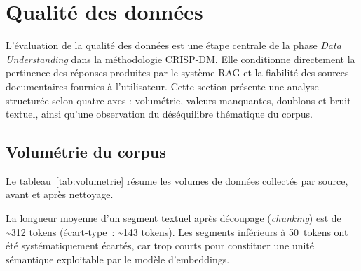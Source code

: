 \section{Qualité des données}
\label{sec:qualite_donnees}

L’évaluation de la qualité des données est une étape centrale de la phase \textit{Data Understanding} dans la méthodologie CRISP-DM. Elle conditionne directement la pertinence des réponses produites par le système RAG et la fiabilité des sources documentaires fournies à l’utilisateur. Cette section présente une analyse structurée selon quatre axes : volumétrie, valeurs manquantes, doublons et bruit textuel, ainsi qu’une observation du déséquilibre thématique du corpus.

\subsection{Volumétrie du corpus}

Le tableau~\ref{tab:volumetrie} résume les volumes de données collectés par source, avant et après nettoyage.

\begin{table}[H]
\centering
\renewcommand{\arraystretch}{1.3}
\caption{Volumétrie du corpus par source}
\label{tab:volumetrie}
\end{table}

La longueur moyenne d’un segment textuel après découpage (\textit{chunking}) est de \textasciitilde{}312 tokens (écart-type~: \textasciitilde{}143 tokens). Les segments inférieurs à 50~tokens ont été systématiquement écartés, car trop courts pour constituer une unité sémantique exploitable par le modèle d’embeddings.

